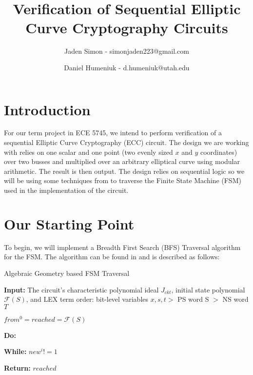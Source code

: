 \documentclass[12pt]{report}
\title{Verification of Sequential Elliptic Curve Cryptography Circuits}
\author{Jaden Simon - simonjaden223@gmail.com \\ \and
	   Daniel Humeniuk - d.humeniuk@utah.edu}
\begin{document}
\maketitle

\section{Introduction}

For our term project in ECE 5745, we intend to perform verification of a sequential Elliptic Curve Cryptography (ECC) circuit. The design we are working with relies on  one scalar and one point (two evenly sized $x$ and $y$ coordinates) over two busses and multiplied over an arbitrary elliptical curve using modular arithmetic. The result is then output. The design relies on sequential logic so we will be using some techniques from \cite{Kalla} to traverse the Finite State Machine (FSM) used in the implementation of the circuit.

\section{Our Starting Point}

To begin, we will implement a Breadth First Search (BFS) Traversal algorithm for the FSM. The algorithm can be found in \cite{Kalla} and is described as follows:

\begin{algorithm}
\caption{Algebraic Geometry based FSM Traversal}

{\textbf{Input:} The circuit's characteristic polynomial ideal $J_{ckt}$, initial state polynomial $\mathcal{F}(S)$, and LEX term order: bit-level variables $x,s,t >$ PS word S $>$ NS word $T$}

{$from^0=reached=\mathcal{F}(S)$}

{\textbf{Do:}}

\hspace*{6mm}{$i \leftarrow i + 1 $}




\hspace*{6mm}{$reached \leftarrow reached*new^i$}

\hspace*{6mm}{$from^i \leftarrow new^i(S$/$T)$}

{\textbf{While:} $new^i != 1$}

{\textbf{Return:} $reached$}

\end{algorithm}
\end{document}
